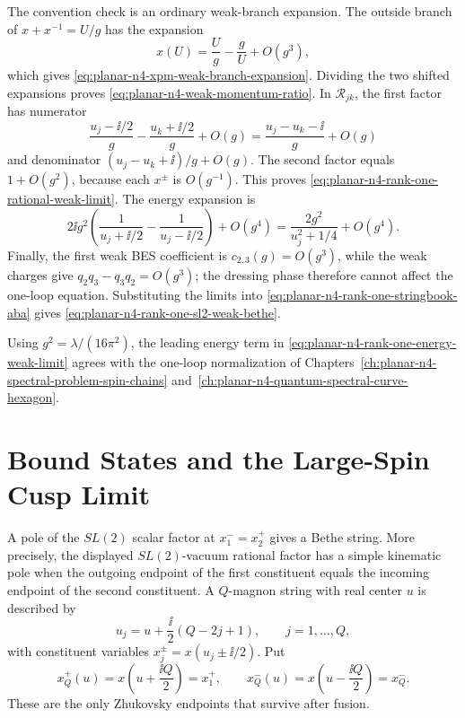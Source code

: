 The convention check is an ordinary weak-branch expansion.  The outside branch
of \(x+x^{-1}=U/g\) has the expansion
\[
  x(U)=\frac{U}{g}-\frac{g}{U}+O(g^3),
\]
which gives \eqref{eq:planar-n4-xpm-weak-branch-expansion}.  Dividing the
two shifted expansions proves \eqref{eq:planar-n4-weak-momentum-ratio}.  In
\(\mathcal R_{jk}\), the first factor has numerator
\[
  \frac{u_j-\ii/2}{g}-\frac{u_k+\ii/2}{g}+O(g)
  =
  \frac{u_j-u_k-\ii}{g}+O(g)
\]
and denominator \((u_j-u_k+\ii)/g+O(g)\).  The second factor equals
\(1+O(g^2)\), because each \(x^\pm\) is \(O(g^{-1})\).  This proves
\eqref{eq:planar-n4-rank-one-rational-weak-limit}.  The energy expansion is
\[
  2\ii g^2\left(
    \frac{1}{u_j+\ii/2}-\frac{1}{u_j-\ii/2}
  \right)+O(g^4)
  =
  \frac{2g^2}{u_j^2+1/4}+O(g^4).
\]
Finally, the first weak BES coefficient is \(c_{2,3}(g)=O(g^3)\), while the
weak charges give \(q_2q_3-q_3q_2=O(g^3)\); the dressing phase therefore
cannot affect the one-loop equation.  Substituting the limits into
\eqref{eq:planar-n4-rank-one-stringbook-aba} gives
\eqref{eq:planar-n4-rank-one-sl2-weak-bethe}.

Using \(g^2=\lambda/(16\pi^2)\), the leading energy term in
\eqref{eq:planar-n4-rank-one-energy-weak-limit} agrees with the one-loop
normalization of Chapters~\ref{ch:planar-n4-spectral-problem-spin-chains}
and~\ref{ch:planar-n4-quantum-spectral-curve-hexagon}.

\section{Bound States and the Large-Spin Cusp Limit}

A pole of the \(SL(2)\) scalar factor at \(x_1^-=x_2^+\) gives a Bethe
string.  More precisely, the displayed \(SL(2)\)-vacuum rational factor has
a simple kinematic pole when the outgoing endpoint of the first constituent
equals the incoming endpoint of the second constituent.  A \(Q\)-magnon
string with real center \(u\) is described by
\[
  u_j=u+\frac{\ii}{2}(Q-2j+1),
  \qquad j=1,\ldots,Q,
\]
with constituent variables \(x_j^\pm=x(u_j\pm\ii/2)\).  Put
\begin{equation}
  x_Q^+(u)=x\!\left(u+\frac{\ii Q}{2}\right)=x_1^+,
  \qquad
  x_Q^-(u)=x\!\left(u-\frac{\ii Q}{2}\right)=x_Q^- .
  \label{eq:planar-n4-bound-state-endpoints}
\end{equation}
These are the only Zhukovsky endpoints that survive after fusion.

